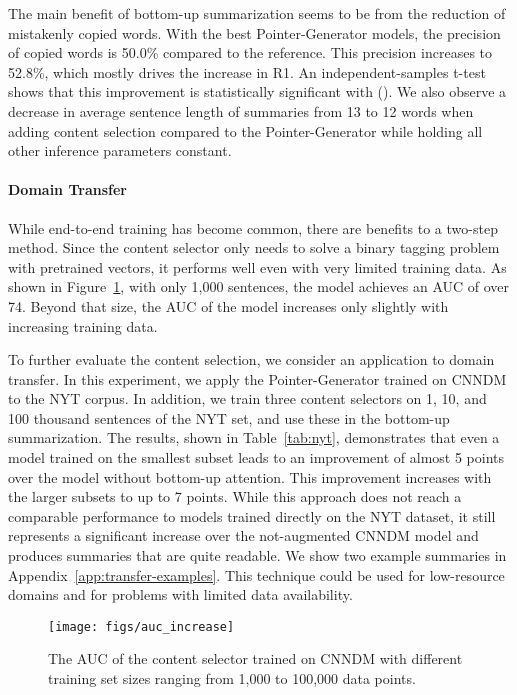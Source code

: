 \documentclass[11pt,a4paper]{article}
\begin{document}
The main benefit of bottom-up summarization seems to be from the reduction of mistakenly copied words. With the best Pointer-Generator models, the precision of copied words is 50.0\%  compared to the reference. This precision increases to 52.8\%, which mostly drives the increase in R1. An independent-samples t-test shows that this improvement is statistically significant with  (). We also observe a decrease in average sentence length of summaries from 13 to 12 words when adding content selection compared to the Pointer-Generator while holding all other inference parameters constant. 


\paragraph{Domain Transfer}
While end-to-end training has become common, there are benefits to a two-step method.
Since the content selector only needs to solve a binary tagging problem with pretrained vectors, it performs well even with very limited training data. As shown in Figure~\ref{fig:auc_increase}, with only 1,000 sentences, the model achieves an AUC of over 74. Beyond that size, the AUC of the model increases only slightly with increasing training data.

To further evaluate the content selection, we consider an application to domain transfer. In this experiment, we apply the Pointer-Generator trained on \gls{CNNDM} to the NYT corpus. In addition, we train three content selectors on 1, 10, and 100 thousand sentences of the NYT set, and use these in the bottom-up summarization. 
The results, shown in Table~\ref{tab:nyt}, demonstrates that even a model trained on the smallest subset leads to an improvement of almost 5 points over the model without bottom-up attention. This improvement increases with the larger subsets to up to 7 points. While this approach does not reach a comparable performance to models trained directly on the NYT dataset, it still represents a significant increase over the not-augmented \gls{CNNDM} model and produces summaries that are quite readable. We show two example summaries in Appendix~\ref{app:transfer-examples}. This technique could be used for low-resource domains and for problems with limited data availability. 

\begin{figure}[t]
\centering
\texttt{[image: figs/auc\_increase]}
\caption{The AUC of the content selector trained on \gls{CNNDM} with different training set sizes ranging from 1,000 to 100,000 data points.}
\label{fig:auc_increase}
\end{figure}
\end{document}
